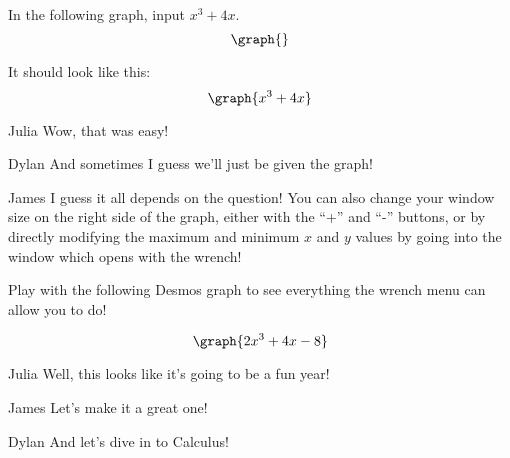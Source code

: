 \documentclass{ximera}
\begin{document}
In the following graph, input $x^3+4x$.
\[
\graph{}
\]

It should look like this:
\[
\graph{x^3+4x}
\]

\begin{dialogue}
\item[Julia] Wow, that was easy!
\item[Dylan] And sometimes I guess we'll just be given the graph!
\item[James] I guess it all depends on the question! You can also change your window size on the right side of the graph, either with the ``+'' and ``-'' buttons, or by directly modifying the maximum and minimum $x$ and $y$ values by going into the window which opens with the wrench!
\end{dialogue}

Play with the following Desmos graph to see everything the wrench menu can allow you to do!

\[
\graph{2x^3+4x-8}
\]
\begin{dialogue}
\item[Julia] Well, this looks like it's going to be a fun year!
\item[James] Let's make it a great one!
\item[Dylan] And let's dive in to Calculus!
\end{dialogue}
\end{document}
